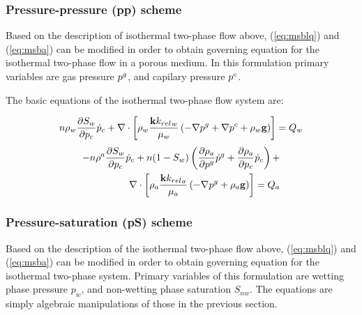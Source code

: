 \subsubsection*{Pressure-pressure (pp) scheme}
Based on the description of isothermal two-phase flow above, (\ref{eq:msblq}) and (\ref{eq:msba}) can be modified in order to obtain governing equation for the isothermal two-phase flow in a porous medium. In this formulation primary variables are gas pressure $p^g$, and capilary pressure $p^c$.

The basic equations of the isothermal two-phase flow system are:

\begin{align}
n \rho_w \dfrac{\partial S_w}{\partial p_c} \dot{p}_c +
\nabla \cdot\left[\rho_w\dfrac{{\mathbf k k_{rel}}_{w}}{\mu_w}\left(-\nabla p^{g} +
\nabla{p}^{c} + \rho_w \mathbf g\right)\right] = Q_w
\end{align}
\begin{align}
- \poro \dens^a \pD{S_w}{\pres_c} \dot\pres_c+
\poro (1 -S_w)\left(\pD{\dens_a}{\pres^g}\dot\pres^g+\pD{\dens_a}{\pres_c}\dot\pres_c\right)+ \nonumber\\
\nabla \cdot \left[\dens_a\dfrac{{\perm \RelKa}_a}{\mu_a} \left(-\nabla\pres^{g} + \dens_a \mathbf g\right) \right] = Q_a
\label{eq:msbl_sim}
\end{align}

\subsubsection*{Pressure-saturation (pS) scheme}
Based on the description of the isothermal two-phase flow above, (\ref{eq:msblq}) and (\ref{eq:msba}) can be modified in order to obtain governing equation for the isothermal two-phase system. Primary variables of this formulation are wetting phase pressure $p_w$, and non-wetting phase saturation $S_{nw}$. The equations are simply algebraic manipulations of those in the previous section.



















